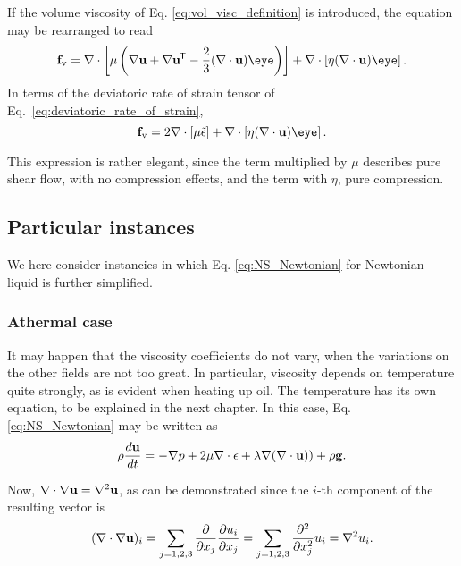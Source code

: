 If the volume viscosity of Eq. \ref{eq:vol_visc_definition} is
introduced, the equation may be rearranged to read
\begin{equation}
  \label{eq:pure_stress_pure_compression}
  \bff_\mathrm{v}=
  \nabla \cdot \left[ \mu  \left(
      \nabla\bfu + \nabla\bfu\tran  - \frac23 (\divu)  \eye
    \right)
  \right] +
  \nabla \cdot \left[ \eta (\divu) \eye \right] .
\end{equation}
In terms of the deviatoric rate of strain tensor of Eq.~\eqref{eq:deviatoric_rate_of_strain},
\begin{equation}
	\label{eq:pure_stress_pure_compressio2}
	\bff_\mathrm{v}=
	2 \nabla \cdot \left[ \mu \tilde{\epsilon} \right] +
	\nabla \cdot \left[ \eta (\divu) \eye \right] .
\end{equation}

This expression is rather elegant, since the term multiplied by $\mu$
describes pure shear flow, with no compression effects, and the term
with $\eta$, pure compression.


\subsection{Particular instances}

We here consider instancies in which Eq. \ref{eq:NS_Newtonian} for
Newtonian liquid is further simplified.


\subsubsection{Athermal case}

It may happen that the viscosity coefficients do not vary, when the
variations on the other fields are not too great. In particular,
viscosity depends on temperature quite strongly, as is evident when
heating up oil. The temperature has its own equation, to be explained
in the next chapter. In this case, Eq. \ref{eq:NS_Newtonian} may be
written as
\begin{equation*}
  \rho \frac{d\mathbf{u} }{dt} =
  - \nabla p +
   2 \mu \nabla \cdot  \epsilon
  + \lambda \nabla ( \nabla\cdot\mathbf{u} ) )
  + \rho \mathbf{g} .
\end{equation*}

Now, $\nabla \cdot  \nabla\mathbf{u} = \nabla^2 \mathbf{u}$, as can be demonstrated
since the $i$-th component of the resulting vector is
\[
(\nabla \cdot \nabla\mathbf{u} )_i =
\sum_{j=1,2,3} 
\frac{\partial}{\partial x_j} 
\frac{\partial u_i}{\partial x_j}
=
\sum_{j=1,2,3} 
\frac{\partial^2 }{\partial x_j^2} 
u_i = \nabla^2 u_i .
\]


